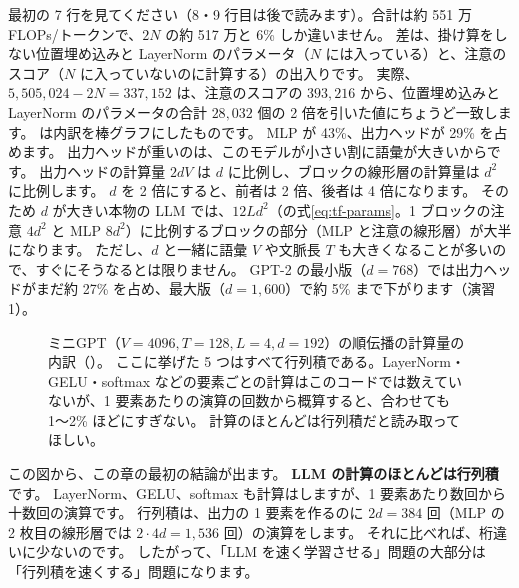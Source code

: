 最初の 7 行を見てください（8・9 行目は後で読みます）。合計は約 551 万 FLOPs/トークンで、$2N$ の約 517 万と 6\% しか違いません。
差は、掛け算をしない位置埋め込みと LayerNorm のパラメータ（$N$ には入っている）と、注意のスコア（$N$ に入っていないのに計算する）の出入りです。
実際、$5{,}505{,}024-2N=337{,}152$ は、注意のスコアの $393{,}216$ から、位置埋め込みと LayerNorm のパラメータの合計 $28{,}032$ 個の 2 倍を引いた値にちょうど一致します。
は内訳を棒グラフにしたものです。
MLP が 43\%、出力ヘッドが 29\% を占めます。
出力ヘッドが重いのは、このモデルが小さい割に語彙が大きいからです。
出力ヘッドの計算量 $2dV$ は $d$ に比例し、ブロックの線形層の計算量は $d^2$ に比例します。
$d$ を 2 倍にすると、前者は 2 倍、後者は 4 倍になります。
そのため $d$ が大きい本物の LLM では、$12Ld^2$（の式\eqref{eq:tf-params}。1 ブロックの注意 $4d^2$ と MLP $8d^2$）に比例するブロックの部分（MLP と注意の線形層）が大半になります。
ただし、$d$ と一緒に語彙 $V$ や文脈長 $T$ も大きくなることが多いので、すぐにそうなるとは限りません。
GPT-2 の最小版（$d=768$）では出力ヘッドがまだ約 27\% を占め、最大版（$d=1{,}600$）で約 5\% まで下がります（演習 1）。

\begin{figure}[!tbp]
\centering
{}
\caption{ミニGPT（$V=4096,T=128,L=4,d=192$）の順伝播の計算量の内訳（）。
ここに挙げた 5 つはすべて行列積である。LayerNorm・GELU・softmax などの要素ごとの計算はこのコードでは数えていないが、1 要素あたりの演算の回数から概算すると、合わせても 1〜2\% ほどにすぎない。
計算のほとんどは行列積だと読み取ってほしい。}
\label{fig:gpu-flops-parts}
\end{figure}

この図から、この章の最初の結論が出ます。
\textbf{LLM の計算のほとんどは行列積}です。
LayerNorm、GELU、softmax も計算はしますが、1 要素あたり数回から十数回の演算です。
行列積は、出力の 1 要素を作るのに $2d=384$ 回（MLP の 2 枚目の線形層では $2\cdot4d=1{,}536$ 回）の演算をします。
それに比べれば、桁違いに少ないのです。
したがって、「LLM を速く学習させる」問題の大部分は「行列積を速くする」問題になります。

